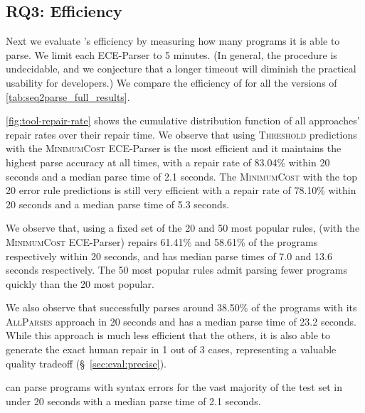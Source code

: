 \subsection{RQ3: Efficiency}
\label{sec:eval:efficiency}


Next we evaluate \toolname's efficiency by measuring how many programs it is
able to parse. We limit each ECE-Parser to 5 minutes. (In general, the procedure
is undecidable, and we conjecture that a longer timeout will diminish the
practical usability for developers.) We compare the efficiency of \toolname for
all the versions of \autoref{tab:seq2parse_full_results}.

\autoref{fig:tool-repair-rate} shows the cumulative distribution function of all
\toolname approaches' repair rates over their repair time. We observe that using
\textsc{Threshold} predictions with the \textsc{MinimumCost} ECE-Parser is the
most efficient and it maintains the highest parse accuracy at all times, with a
repair rate of 83.04\% within 20 seconds and a median parse time of 2.1 seconds.
The \textsc{MinimumCost} with the top 20 error rule predictions is still very
efficient with a repair rate of 78.10\% within 20 seconds and a median parse
time of 5.3 seconds.

We observe that, using a fixed set of the 20 and 50 most popular rules,
\toolname (with the \textsc{MinimumCost} ECE-Parser) repairs 61.41\% and 58.61\%
of the programs respectively within 20 seconds, and has median parse times of
7.0 and 13.6 seconds respectively. The 50 most popular rules admit parsing fewer
programs quickly than the 20 most popular.

We also observe that \toolname successfully parses around 38.50\% of the
programs with its \textsc{AllParses} approach in 20 seconds and has a median
parse time of 23.2 seconds. While this approach is much less efficient that the
others, it is also able to generate the exact human repair in 1 out of 3
cases, representing a valuable quality tradeoff (\S~\ref{sec:eval:precise}).

\begin{framed}
  \noindent \toolname can parse programs with syntax errors for the vast
  majority of the test set in under 20 seconds with a median parse time of 2.1
  seconds.
\end{framed}


